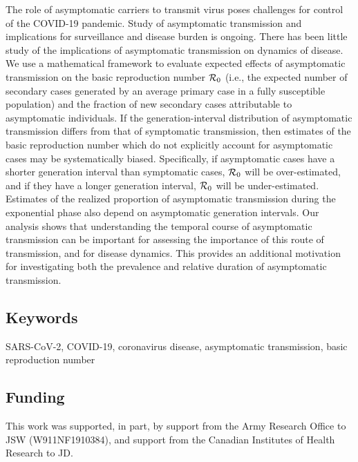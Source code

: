 {\footnotesize 

The role of asymptomatic carriers to transmit virus poses challenges for control of the COVID-19 pandemic. 
Study of asymptomatic transmission and implications for surveillance and disease burden is ongoing. 
There has been little study of the implications of asymptomatic transmission on dynamics of disease.
We use a mathematical framework to evaluate expected effects of asymptomatic transmission on the basic reproduction number ${\cal{R}}_0$ (i.e., the expected number of secondary cases generated by an average primary case in a fully susceptible population) and the fraction of new secondary cases attributable to asymptomatic individuals.
If the generation-interval distribution of asymptomatic transmission differs from that of symptomatic transmission, then estimates of the basic reproduction number which do not explicitly account for asymptomatic cases may be systematically biased. 
Specifically, if asymptomatic cases have a shorter generation interval than symptomatic cases, ${\cal{R}}_0$ will be over-estimated, and if they have a longer generation interval, ${\cal{R}}_0$ will be under-estimated.
Estimates of the realized proportion of asymptomatic transmission during the exponential phase also depend on asymptomatic generation intervals.
Our analysis shows that understanding the temporal course of asymptomatic transmission can be important for assessing the importance of this route of transmission, and for disease dynamics. This provides an additional motivation for investigating both the prevalence and relative duration of asymptomatic transmission. 

\subsection*{Keywords}

SARS-CoV-2, COVID-19, coronavirus disease, asymptomatic transmission, basic reproduction number

\subsection*{Funding}

This work was supported, in part, by support from the Army Research Office to JSW (W911NF1910384), and support from the Canadian Institutes of Health Research to JD.}
